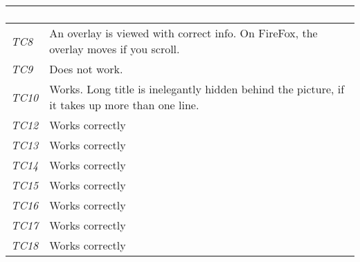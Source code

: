 \begin{minipage}{\linewidth}
\begin{tabular}{ |l|p{70mm}| }
\begin{enumerate}[label=\alph*)]
	                              \end{enumerate}\\ \hline
	\it{\cellcolor{gray!25}TC8} & An overlay is viewed with correct info. On FireFox, the overlay moves if you scroll. \\ \hline
	\it{\cellcolor{gray!25}TC9} & Does not work. \\ \hline
	\it{\cellcolor{gray!25}TC10} & Works. Long title is inelegantly hidden behind the picture, if it takes up more than one line. \\ \hline
	\it{\cellcolor{gray!25}TC12} & Works correctly \\ \hline
	\it{\cellcolor{gray!25}TC13} & Works correctly \\ \hline
	\it{\cellcolor{gray!25}TC14} & Works correctly \\ \hline
	\it{\cellcolor{gray!25}TC15} & Works correctly \\ \hline
	\it{\cellcolor{gray!25}TC16} & Works correctly \\ \hline
	\it{\cellcolor{gray!25}TC17} & Works correctly \\ \hline
	\it{\cellcolor{gray!25}TC18} & Works correctly \\ \hline
\end{tabular}
\medskip
\end{minipage}
%
